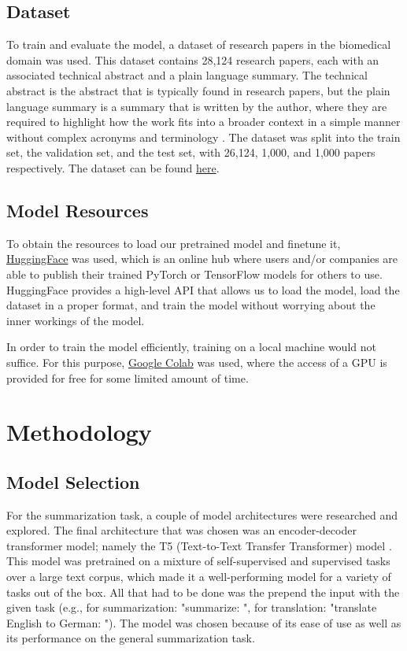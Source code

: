 \documentclass[11pt,a4paper]{article}
\begin{document}
\subsection{Dataset}
\indent \indent To train and evaluate the model, a dataset of research papers in the biomedical domain was used. This dataset contains 28,124 research papers, each with an associated technical abstract and a plain language summary. The technical abstract is the abstract that is typically found in research papers, but the plain language summary is a summary that is written by the author, where they are required to highlight how the work fits into a broader context in a simple manner without complex acronyms and terminology \cite{luo2022readability}. The dataset was split into the train set, the validation set, and the test set, with 26,124, 1,000, and 1,000 papers respectively. The dataset can be found \href{https://www.dropbox.
com/s/huwm01glsk9fou0/plos_readability_ctrl_sum_
corpus.rar?dl=0}{here}.

\subsection{Model Resources}

\indent \indent To obtain the resources to load our pretrained model and finetune it, \href{https://huggingface.co/}{HuggingFace} was used, which is an online hub where users and/or companies are able to publish their trained PyTorch or TensorFlow models for others to use. HuggingFace provides a high-level API that allows us to load the model, load the dataset in a proper format, and train the model without worrying about the inner workings of the model.

In order to train the model efficiently, training on a local machine would not suffice. For this purpose, \href{colab.research.google.com}{Google Colab} was used, where the access of a GPU is provided for free for some limited amount of time.

\section{Methodology}

\subsection{Model Selection}
\indent \indent For the summarization task, a couple of model architectures were researched and explored. The final architecture that was chosen was an encoder-decoder transformer model; namely the T5 (Text-to-Text Transfer Transformer) model \cite{raffel2020exploring}. This model was pretrained on a mixture of self-supervised and supervised tasks over a large text corpus, which made it a well-performing model for a variety of tasks out of the box. All that had to be done was the prepend the input with the given task (e.g., for summarization: "summarize: ", for translation: "translate English to German: "). The model was chosen because of its ease of use as well as its performance on the general summarization task.
\end{document}

